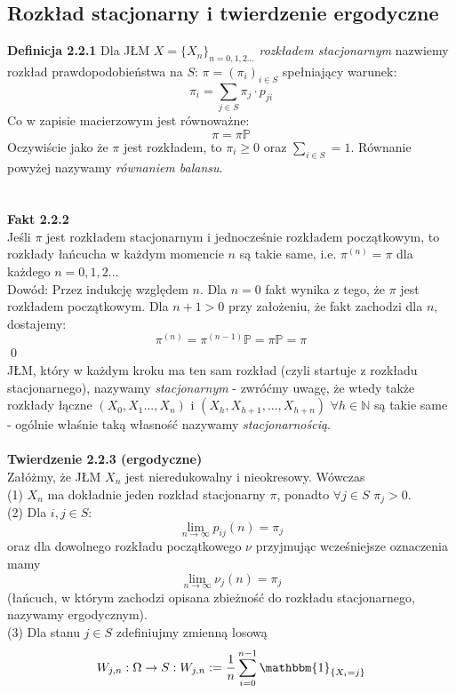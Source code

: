 \documentclass[a4paper]{article}
\begin{document}
\subsection{Rozkład stacjonarny i twierdzenie ergodyczne}
\textbf{Definicja 2.2.1}
Dla JŁM $X = \{X_n\}_{n = 0,1,2...}$ \textit{rozkładem stacjonarnym} nazwiemy rozkład prawdopodobieństwa na $S$: $\pi = (\pi_i)_{i \in S}$ spełniający warunek: \\
$$\pi_i = \sum\limits_{j \in S} \pi_j \cdot p_{ji}$$
Co w zapisie macierzowym jest równoważne:
$$\pi = \pi \mathbb{P}$$
Oczywiście jako że $\pi$ jest rozkładem, to $\pi_i \geq 0$ oraz $\sum\limits_{i \in S} = 1$. Równanie powyżej nazywamy \textit{równaniem balansu}.\\
\\\\
\textbf{Fakt 2.2.2}\\
Jeśli $\pi$ jest rozkładem stacjonarnym i jednocześnie rozkładem początkowym, to rozkłady łańcucha w każdym momencie $n$ są takie same, i.e. $\pi^{(n)} = \pi$ dla każdego $n = 0,1,2..$.
\\
Dowód: Przez indukcję względem $n$. Dla $n = 0$ fakt wynika z tego, że $\pi$ jest rozkładem początkowym. Dla $n+1>0$ przy założeniu, że fakt zachodzi dla $n$, dostajemy:
$$\pi^{(n)} = \pi^{(n-1)} \mathbb{P} = \pi \mathbb{P} = \pi$$ \qed\\
JŁM, który w każdym kroku ma ten sam rozkład (czyli startuje z rozkładu stacjonarnego), nazywamy \textit{stacjonarnym} - zwróćmy uwagę, że wtedy także rozkłady łączne $(X_0, X_1 ..., X_n)$ i $(X_h, X_{h+1}, ..., X_{h+n})$ $\forall h \in \mathbb{N}$ są takie same - ogólnie właśnie taką własność nazywamy \textit{stacjonarnością}.
\\\\
\textbf{Twierdzenie 2.2.3 (ergodyczne)}
\\ Załóżmy, że JŁM $X_n$ jest nieredukowalny i nieokresowy. Wówczas
\\ (1) $X_n$ ma dokładnie jeden rozkład stacjonarny $\pi$, ponadto $\forall j \in S$ $\pi_j > 0$.
\\ (2) Dla $i,j \in S$: $$\lim\limits_{n \to \infty} p_{ij}(n) = \pi_j$$ oraz dla dowolnego rozkładu początkowego $\nu$ przyjmując wcześniejsze oznaczenia mamy $$\lim\limits_{n \to \infty} \nu_j(n) = \pi_j$$ (łańcuch, w którym zachodzi opisana zbieżność do rozkładu stacjonarnego, nazywamy ergodycznym).
\\
(3) Dla stanu $j \in S$ zdefiniujmy zmienną losową $$W_{j,n}: \Omega \rightarrow S: W_{j,n} :=  \frac{1}{n} \sum\limits_{i = 0}^{n-1} \mathbbm{1}_{\{X_i = j\}}$$
\end{document}
